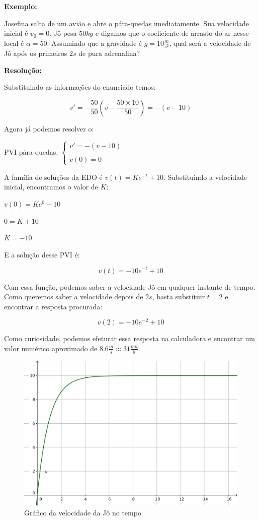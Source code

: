 \documentclass[a4paper]{article}
\begin{document}
{\bf Exemplo:}

Josefina salta de um avião e abre o pára-quedas imediatamente. Sua
velocidade inicial é $v_0=0$. Jô pesa $50kg$ e digamos que o
coeficiente de arrasto do ar nesse local é $\alpha = 50$. Assumindo
que a gravidade é $g=10\frac{m}{s^2}$, qual será a velocidade de Jô
após os primeiros $2s$ de pura adrenalina?

{\bf Resolução:}

Substituindo as informações do enunciado temos:

\begin{displaymath}
  v' =  -\frac{50}{50} ( v - \frac{50 \times 10}{50}) = - (v - 10)
\end{displaymath}

Agora já podemos resolver o:

PVI pára-quedas: $\left\{
    \begin{array}{l}
      v' = - (v - 10)
      \\
      \\
      v(0)=0
    \end{array}
  \right.$

A família de soluções da EDO é $v(t)=K e^{-t}+10$. Substituindo a
velocidade inicial, encontramos o valor de $K$:

$v(0) = K e^0 +10$

$0 = K+10$

$K=-10$

E a solução desse PVI é:

\begin{displaymath}
  v(t) = -10e^{-t}+10
\end{displaymath}

Com essa função, podemos saber a velocidade Jô em qualquer instante de
tempo. Como queremos saber a velocidade depois de $2s$, basta
substituir $t=2$ e encontrar a resposta procurada:

\begin{displaymath}
  v(2)=-10 e^{-2}+10
\end{displaymath}

Como curiosidade, podemos efeturar essa resposta na calculadora e
encontrar um valor numérico aproximado de
$8.6\frac{m}{s} \approx 31\frac{km}{h}$.

\begin{figure}[h]
  \centering
  \includegraphics[width=.9\textwidth]{pqd}
  \caption{Gráfico da velocidade da Jô no tempo}
  \label{fig:PQD}
\end{figure}
\end{document}
